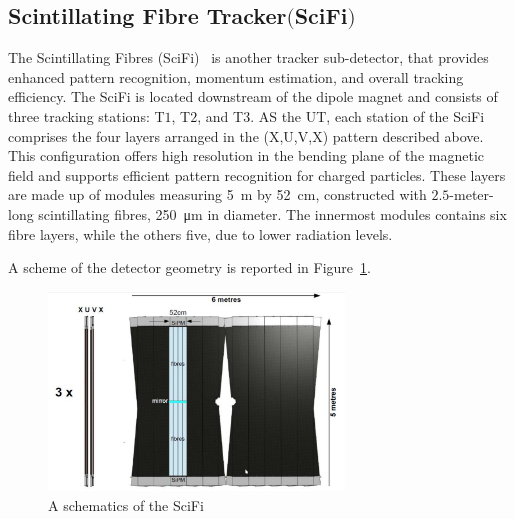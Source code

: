 \subsection[Scintillating Fibre Tracker]{Scintillating Fibre Tracker$ \bigl($SciFi$\bigr)$}
The Scintillating Fibres (SciFi)~\cite{scifi} is another tracker sub-detector, that provides enhanced pattern recognition, momentum estimation, and overall tracking efficiency.
The SciFi is located downstream of the dipole magnet and consists of three tracking stations: T$1$, T$2$, and T$3$. AS the UT, each station of the SciFi comprises the four layers arranged in the (X,U,V,X) pattern described above.  This configuration offers high resolution in the bending plane of the magnetic field and supports efficient pattern recognition for charged particles. These layers are made up of modules measuring \SI{5}{\meter} by \SI{52}{\centi\meter}, constructed with $2.5$-meter-long scintillating fibres, \SI{250}{\micro\meter} in diameter. The innermost modules contains six fibre layers, while the others five, due to lower radiation levels.

A scheme of the detector geometry is reported in Figure~\ref{fig:scifi}.


\begin{figure}
    \centering
    \includegraphics[width=0.7\textwidth]{figures/scifi.png}
    \caption{A schematics of the SciFi}
    \label{fig:scifi}
\end{figure}


